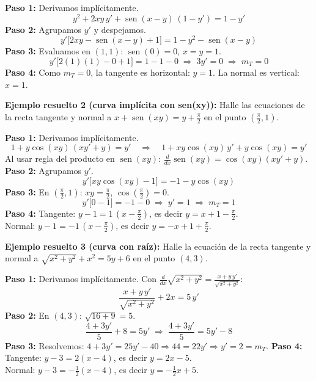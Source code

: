 \documentclass[12pt, letterpaper]{article}
\begin{document}
\begin{cuadrosolucion}
  \textbf{Paso 1:} Derivamos implícitamente.
  \[
    y^2 + 2xy\,y' + \operatorname{sen}(x-y)\,(1-y') = 1 - y'
  \]
  \textbf{Paso 2:} Agrupamos $y'$ y despejamos.
  \[
    y'\bigl[2xy - \operatorname{sen}(x-y) + 1\bigr] = 1 - y^2 - \operatorname{sen}(x-y)
  \]
  \textbf{Paso 3:} Evaluamos en $(1,1)$: $\operatorname{sen}(0)=0$, $x=y=1$.
  \[
    y'\bigl[2(1)(1) - 0 + 1\bigr] = 1 - 1 - 0 \;\Rightarrow\; 3y' = 0 \;\Rightarrow\; m_T = 0
  \]
  \textbf{Paso 4:} Como $m_T = 0$, la tangente es horizontal: $y = 1$. La normal es vertical: $x = 1$.
\end{cuadrosolucion}

\noindent\textbf{Ejemplo resuelto 2 (curva implícita con sen(xy)):} Halle las ecuaciones de la recta tangente y normal a $x + \operatorname{sen}(xy) = y + \frac{\pi}{2}$ en el punto $\left(\frac{\pi}{2}, 1\right)$.

\begin{cuadrosolucion}
  \textbf{Paso 1:} Derivamos implícitamente.
  \[
    1 + y\cos(xy)\,(xy' + y) = y' \quad \Rightarrow \quad 1 + xy\cos(xy)\,y' + y\cos(xy) = y'
  \]
  Al usar regla del producto en $\operatorname{sen}(xy)$: $\frac{d}{dx}\operatorname{sen}(xy) = \cos(xy)(xy' + y)$.
  \textbf{Paso 2:} Agrupamos $y'$.
  \[
    y'\bigl[xy\cos(xy) - 1\bigr] = -1 - y\cos(xy)
  \]
  \textbf{Paso 3:} En $\left(\frac{\pi}{2}, 1\right)$: $xy = \frac{\pi}{2}$, $\cos(\frac{\pi}{2}) = 0$.
  \[
    y'\bigl[0 - 1\bigr] = -1 - 0 \;\Rightarrow\; y' = 1 \;\Rightarrow\; m_T = 1
  \]
  \textbf{Paso 4:} Tangente: $y - 1 = 1\,(x - \frac{\pi}{2})$, es decir $y = x + 1 - \frac{\pi}{2}$.
  \\[2pt]
  Normal: $y - 1 = -1\,(x - \frac{\pi}{2})$, es decir $y = -x + 1 + \frac{\pi}{2}$.
\end{cuadrosolucion}

\noindent\textbf{Ejemplo resuelto 3 (curva con raíz):} Halle la ecuación de la recta tangente y normal a $\sqrt{x^2 + y^2} + x^2 = 5y + 6$ en el punto $(4, 3)$.

\begin{cuadrosolucion}
  \textbf{Paso 1:} Derivamos implícitamente. Con $\frac{d}{dx}\sqrt{x^2+y^2} = \frac{x + y\,y'}{\sqrt{x^2+y^2}}$:
  \[
    \frac{x + y\,y'}{\sqrt{x^2+y^2}} + 2x = 5\,y'
  \]
  \textbf{Paso 2:} En $(4,3)$: $\sqrt{16+9} = 5$.
  \[
    \frac{4 + 3y'}{5} + 8 = 5y' \;\Rightarrow\; \frac{4 + 3y'}{5} = 5y' - 8
  \]
  \textbf{Paso 3:} Resolvemos: $4 + 3y' = 25y' - 40 \Rightarrow 44 = 22y' \Rightarrow y' = 2 = m_T$.
  \textbf{Paso 4:} Tangente: $y - 3 = 2(x - 4)$, es decir $y = 2x - 5$.
  \\[2pt]
  Normal: $y - 3 = -\frac{1}{2}(x - 4)$, es decir $y = -\frac{1}{2}x + 5$.
\end{cuadrosolucion}
\end{document}
